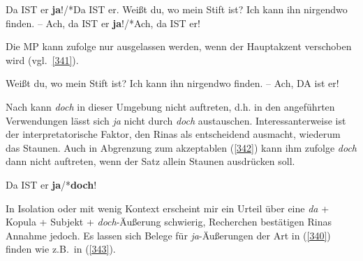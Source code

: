 \begin{exe}
	\ex\label{340} 
		\begin{xlist}	
			\ex\label{340a} Da IST er \textbf{ja}!/*Da IST er.
			\ex\label{340b} Weißt du, wo mein Stift ist? Ich kann ihn nirgendwo finden. – Ach, da IST er \textbf{ja}!/*Ach, da IST er!	         
			\hfill\hbox{\citet[167]{Rinas2006}}
		\end{xlist}
\end{exe}
Die MP kann \citet[168]{Rinas2006} zufolge nur ausgelassen werden, wenn der Haupt\-akzent verschoben wird (vgl.\ \ref{341}). 

\begin{exe}
	\ex\label{341} 
	Weißt du, wo mein Stift ist? Ich kann ihn nirgendwo finden. – Ach, DA ist er!
	\hfill\hbox{\citet[168]{Rinas2006}}	
\end{exe}
Nach \citet[217]{Rinas2006} kann \textit{doch} in dieser Umgebung nicht auftreten, d.h. in den angeführten Verwendungen lässt sich \textit{ja} nicht durch \textit{doch} austauschen. Interessanterweise ist der interpretatorische Faktor, den Rinas als entscheidend ausmacht, wiederum das Staunen. Auch in Abgrenzung zum akzeptablen (\ref{342}) kann ihm zufolge \textit{doch} dann nicht auftreten, wenn der Satz allein Staunen ausdrücken soll. 

\begin{exe}
	\ex\label{342} 	
	Da IST er \textbf{ja}/*\textbf{doch}!	
	\hfill\hbox{\citet[217]{Rinas2006}}
\end{exe}											     
In Isolation oder mit wenig Kontext erscheint mir ein Urteil über eine \textit{da} + Kopula + Subjekt + \textit{doch}-Äußerung schwierig, Recherchen bestätigen Rinas Annahme jedoch. Es lassen sich Belege für \textit{ja}-Äußerungen der Art in (\ref{340}) finden wie z.B.\ in (\ref{343}).

